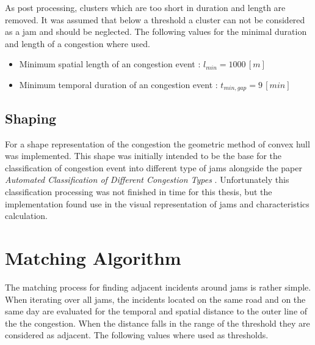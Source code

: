 As post processing, clusters which are too short in duration and length are removed. It was assumed that below a threshold a cluster can not be considered as a jam and should be neglected. The following values for the minimal duration and length of a congestion where used.

\begin{itemize}
	\item Minimum spatial length of an congestion event : $l_{min} = 1000 \,[m]$
	\item Minimum temporal duration of an congestion event : $t_{min,gap} = 9 \,[min]$
\end{itemize}

\subsection{Shaping}
\label{methodology_detection_shaping}
For a shape representation of the congestion the geometric method of convex hull was implemented. This shape was initially intended to be the base for the classification of congestion event into different type of jams alongside the paper \textit{Automated Classification of Different Congestion Types} \parencite{Kessler2020}. Unfortunately this classification processing was not finished in time for this thesis, but the implementation found use in the visual representation of jams and characteristics calculation.


\section{Matching Algorithm}
\label{methodology_matching}
The matching process for finding adjacent incidents around jams is rather simple. When iterating over all jams, the incidents located on the same road and on the same day are evaluated for the temporal and spatial distance to the outer line of the the congestion. When the distance falls in the range of the threshold they are considered as adjacent. The following values where used as thresholds.

